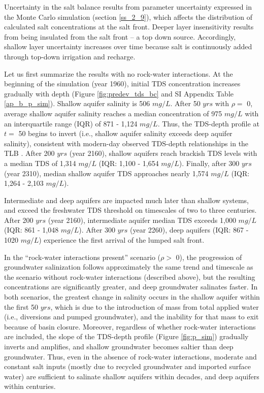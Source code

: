 Uncertainty in the salt balance results from parameter uncertainty expressed in the Monte Carlo simulation (section \ref{ss_2_9}), which affects the distribution of calculated salt concentrations at the salt front. Deeper layer insensitivity results from being insulated from the salt front -- a top down source. Accordingly, shallow layer uncertainty increases over time because salt is continuously added through top-down irrigation and recharge. 

Let us first summarize the results with no rock-water interactions. At the beginning of the simulation (year 1960), initial TDS concentration increases gradually with depth (Figure \ref{fig:predev_tds_bc} and SI Appendix Table \ref{ap_b_p_sim}). Shallow aquifer salinity is 506 $mg/L$. After 50 $yrs$ with $\rho = $ 0, average shallow aquifer salinity reaches a median concentration of 975 $mg/L$ with an interquartile range (IQR) of 871 - 1,124 $mg/L$. Thus, the TDS-depth profile at $t =$ 50 begins to invert (i.e., shallow aquifer salinity exceeds deep aquifer salinity), consistent with modern-day observed TDS-depth relationships in the TLB \citep{Hansen2018}. After 200 $yrs$ (year 2160), shallow aquifers reach brackish TDS levels with a median TDS of 1,314 $mg/L$ (IQR: 1,100 - 1,654 $mg/L$). Finally, after 300 $yrs$ (year 2310), median shallow aquifer TDS approaches nearly 1,574 $mg/L$ (IQR: 1,264 - 2,103 $mg/L$). 

Intermediate and deep aquifers are impacted much later than shallow systems, and exceed the freshwater TDS threshold on timescales of two to three centuries. After 200 $yrs$ (year 2160), intermediate aquifer median TDS exceeds 1,000 $mg/L$ (IQR: 861 - 1,048 $mg/L$). After 300 $yrs$ (year 2260), deep aquifers (IQR: 867 - 1020 $mg/L$) experience the first arrival of the lumped salt front. 

In the ``rock-water interactions present'' scenario ($\rho >$ 0), the progression of groundwater salinization follows approximately the same trend and timescale as the scenario without rock-water interactions (described above), but the resulting concentrations are significantly greater, and deep groundwater salinates faster. In both scenarios, the greatest change in salinity occurs in the shallow aquifer within the first 50 $yrs$, which is due to the introduction of mass from total applied water (i.e., diversions and pumped groundwater), and the inability for that mass to exit because of basin closure. Moreover, regardless of whether rock-water interactions are included, the slope of the TDS-depth profile (Figure \ref{fig:p_sim}) gradually inverts and amplifies, and shallow groundwater becomes saltier than deep groundwater. Thus, even in the absence of rock-water interactions, moderate and constant salt inputs (mostly due to recycled groundwater and imported surface water) are sufficient to salinate shallow aquifers within decades, and deep aquifers within centuries. 


